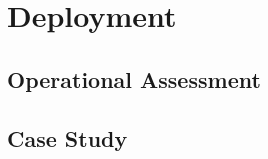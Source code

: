 \section{Deployment}\label{sec:deployment}

\subsection{Operational Assessment}

\subsection{Case Study}
